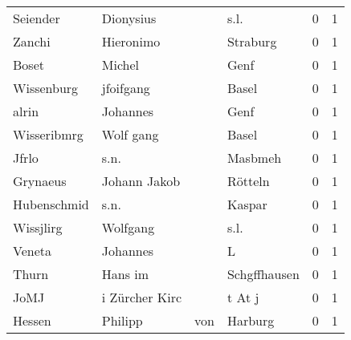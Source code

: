 \begin{center}
\begin{tiny}
\begin{longtabu}{llllrr}
                 Seiender &                          Dionysius &             &                                        s.l. &          0 &         1 \\
                   Zanchi &                          Hieronimo &             &                                    Straburg &          0 &         1 \\
                    Boset &                             Michel &             &                                        Genf &          0 &         1 \\
               Wissenburg &                          jfoifgang &             &                                       Basel &          0 &         1 \\
                    alrin &                           Johannes &             &                                        Genf &          0 &         1 \\
              Wisseribmrg &                          Wolf gang &             &                                       Basel &          0 &         1 \\
                    Jfrlo &                               s.n. &             &                                     Masbmeh &          0 &         1 \\
                 Grynaeus &                       Johann Jakob &             &                                     Rötteln &          0 &         1 \\
              Hubenschmid &                               s.n. &             &                                      Kaspar &          0 &         1 \\
                Wissjlirg &                           Wolfgang &             &                                        s.l. &          0 &         1 \\
                   Veneta &                           Johannes &             &                                           L &          0 &         1 \\
                    Thurn &                            Hans im &             &                                Schgffhausen &          0 &         1 \\
                     JoMJ &                     i Zürcher Kirc &             &                                      t At j &          0 &         1 \\
                   Hessen &                            Philipp &         von &                                     Harburg &          0 &         1 \\

\end{longtabu}
\end{tiny}
\end{center}
